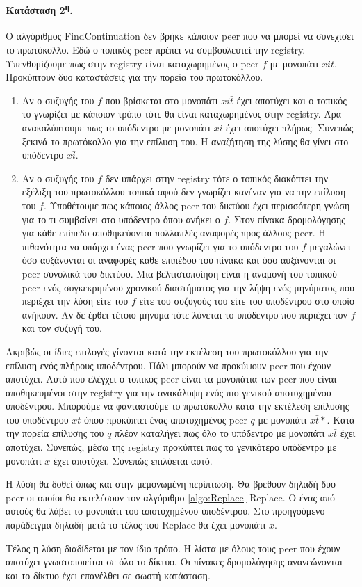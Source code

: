 \paragraph{Κατάσταση 2\textsuperscript{η}.}
Ο αλγόριθμος FindContinuation δεν βρήκε κάποιον peer που να μπορεί να 
συνεχίσει το πρωτόκολλο. Εδώ ο τοπικός peer πρέπει να συμβουλευτεί την 
registry. Υπενθυμίζουμε πως στην registry είναι καταχωρημένος ο peer $f$ 
με μονοπάτι $xit$. Προκύπτουν δυο καταστάσεις για την πορεία του πρωτοκόλλου. 
\begin{enumerate}
\item Αν ο συζυγής του $f$ που βρίσκεται στο μονοπάτι $xi \bar t$ έχει 
αποτύχει και ο τοπικός το γνωρίζει με κάποιον τρόπο τότε θα είναι 
καταχωρημένος στην registry. Άρα ανακαλύπτουμε πως το υπόδεντρο με μονοπάτι 
$xi$ έχει αποτύχει πλήρως. Συνεπώς ξεκινά το πρωτόκολλο για την επίλυση του. 
Η αναζήτηση της λύσης θα γίνει στο υπόδεντρο $x \bar i$.
\item Αν ο συζυγής του $f$ δεν υπάρχει στην registry τότε ο τοπικός διακόπτει 
την εξέλιξη του πρωτοκόλλου τοπικά αφού δεν γνωρίζει κανέναν για να την επίλυση 
του $f$. Υποθέτουμε πως κάποιος άλλος peer του δικτύου έχει περισσότερη γνώση 
για το τι συμβαίνει στο υπόδεντρο όπου ανήκει ο $f$. Στον πίνακα 
δρομολόγησης για κάθε επίπεδο αποθηκεύονται πολλαπλές αναφορές προς άλλους 
peer. Η πιθανότητα να υπάρχει ένας peer που γνωρίζει για το υπόδεντρο του 
$f$ μεγαλώνει όσο αυξάνονται οι αναφορές κάθε επιπέδου του πίνακα και όσο 
αυξάνονται οι peer συνολικά του δικτύου. 
Μια βελτιστοποίηση είναι η αναμονή του τοπικού peer ενός συγκεκριμένου 
χρονικού διαστήματος για την λήψη ενός μηνύματος που περιέχει την λύση είτε του 
$f$ είτε του συζυγούς του είτε του υποδέντρου στο οποίο ανήκουν. Αν δε έρθει 
τέτοιο μήνυμα τότε λύνεται το υπόδεντρο που περιέχει τον $f$ και τον συζυγή 
του.
\end{enumerate}

Ακριβώς οι ίδιες επιλογές γίνονται κατά την εκτέλεση του πρωτοκόλλου για 
την επίλυση ενός πλήρους υποδέντρου. Πάλι μπορούν να προκύψουν peer που έχουν 
αποτύχει. Αυτό που ελέγχει ο τοπικός peer είναι τα μονοπάτια των peer 
που είναι αποθηκευμένοι στην registry για την ανακάλυψη ενός πιο γενικού 
αποτυχημένου υποδέντρου. Μπορούμε να φανταστούμε το πρωτόκολλο κατά την 
εκτέλεση επίλυσης του υποδέντρου $xt$ όπου προκύπτει ένας αποτυχημένος peer $q$
με μονοπάτι $x \bar t*$. Κατά την πορεία επίλυσης του $q$ πλέον καταλήγει 
πως όλο το υπόδεντρο με μονοπάτι $x \bar t$ έχει αποτύχει. Συνεπώς, μέσω της 
registry προκύπτει πως το γενικότερο υπόδεντρο με μονοπάτι $x$ έχει αποτύχει. 
Συνεπώς επιλύεται αυτό.

Η λύση θα δοθεί όπως και στην μεμονωμένη περίπτωση. Θα βρεθούν δηλαδή δυο 
peer οι οποίοι θα εκτελέσουν τον αλγόριθμο \ref{algo:Replace} Replace. Ο 
ένας από αυτούς θα λάβει το μονοπάτι του αποτυχημένου υποδέντρου. Στο 
προηγούμενο παράδειγμα δηλαδή μετά το τέλος του Replace θα έχει μονοπάτι 
$x$. 

Τέλος η λύση διαδίδεται με τον ίδιο τρόπο. Η λίστα με όλους τους peer που 
έχουν αποτύχει γνωστοποιείται σε όλο το δίκτυο. Οι πίνακες δρομολόγησης 
ανανεώνονται και το δίκτυο έχει επανέλθει σε σωστή κατάσταση.
